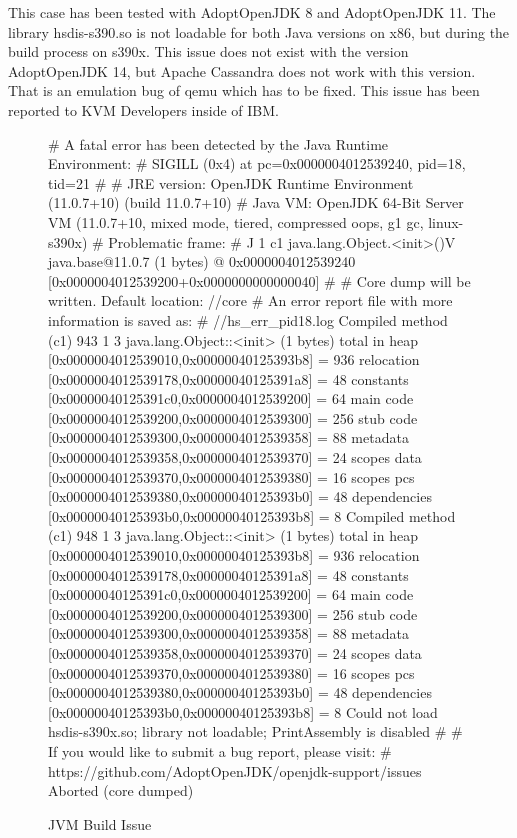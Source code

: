 This case has been tested with AdoptOpenJDK 8 and AdoptOpenJDK 11. The library hsdis-s390.so is not loadable for both Java versions on x86, but during the build process on s390x. This issue does not exist with the version AdoptOpenJDK 14, but Apache Cassandra does not work with this version. \\
That is an emulation bug of qemu which has to be fixed. This issue has been reported to KVM Developers inside of IBM. 
\begin{figure}[H]
\centering
\begin{boxedverbatim}
# A fatal error has been detected by the Java Runtime Environment:
#  SIGILL (0x4) at pc=0x0000004012539240, pid=18, tid=21
#
# JRE version: OpenJDK Runtime Environment (11.0.7+10) (build 11.0.7+10)
# Java VM: OpenJDK 64-Bit Server VM (11.0.7+10, mixed mode, tiered, compressed oops, 
g1 gc, linux-s390x)
# Problematic frame:
# J 1 c1 java.lang.Object.<init>()V java.base@11.0.7 (1 bytes) @ 0x0000004012539240 
[0x0000004012539200+0x0000000000000040]
#
# Core dump will be written. Default location: //core
# An error report file with more information is saved as:
# //hs_err_pid18.log
Compiled method (c1)     943    1       3       java.lang.Object::<init> (1 bytes)
 total in heap  [0x0000004012539010,0x00000040125393b8] = 936
 relocation     [0x0000004012539178,0x00000040125391a8] = 48
 constants      [0x00000040125391c0,0x0000004012539200] = 64
 main code      [0x0000004012539200,0x0000004012539300] = 256
 stub code      [0x0000004012539300,0x0000004012539358] = 88
 metadata       [0x0000004012539358,0x0000004012539370] = 24
 scopes data    [0x0000004012539370,0x0000004012539380] = 16
 scopes pcs     [0x0000004012539380,0x00000040125393b0] = 48
 dependencies   [0x00000040125393b0,0x00000040125393b8] = 8
Compiled method (c1)     948    1       3       java.lang.Object::<init> (1 bytes)
 total in heap  [0x0000004012539010,0x00000040125393b8] = 936
 relocation     [0x0000004012539178,0x00000040125391a8] = 48
 constants      [0x00000040125391c0,0x0000004012539200] = 64
 main code      [0x0000004012539200,0x0000004012539300] = 256
 stub code      [0x0000004012539300,0x0000004012539358] = 88
 metadata       [0x0000004012539358,0x0000004012539370] = 24
 scopes data    [0x0000004012539370,0x0000004012539380] = 16
 scopes pcs     [0x0000004012539380,0x00000040125393b0] = 48
 dependencies   [0x00000040125393b0,0x00000040125393b8] = 8
Could not load hsdis-s390x.so; library not loadable; PrintAssembly is disabled
#
# If you would like to submit a bug report, please visit:
#   https://github.com/AdoptOpenJDK/openjdk-support/issues
Aborted (core dumped) 
\end{boxedverbatim}
 \caption{JVM Build Issue}
    \label{jvm-issue}
\end{figure}


